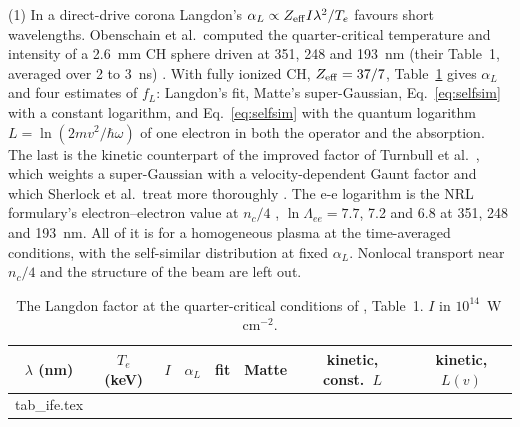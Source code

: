 \documentclass[11pt]{article}
\makeatletter
\numberwithin{equation}{section}
\newcommand{\tabinput}[1]{\@@input #1 }
\newcommand{\lnL}{\ln\Lambda}
\makeatother
\begin{document}
{\noindent}(1) In a direct-drive corona Langdon's $\alpha_L\propto
Z_{\rm eff}I\lambda^2/T_e$ favours short wavelengths. Obenschain et al.\ computed
the quarter-critical temperature and intensity of a 2.6~mm CH sphere driven at 351,
248 and 193~nm (their Table~1, averaged over 2 to 3~ns) \cite{Obenschain2020}. With
fully ionized CH, $Z_{\rm eff}=37/7$, Table~\ref{tab:ife} gives $\alpha_L$ and four
estimates of $f_L$: Langdon's fit, Matte's super-Gaussian, Eq.~\eqref{eq:selfsim}
with a constant logarithm, and Eq.~\eqref{eq:selfsim} with the quantum logarithm
$L=\ln(2mv^2/\hbar\omega)$ of one electron in both the operator and the absorption.
The last is the kinetic counterpart of the improved factor of Turnbull et al.\
\cite{Turnbull2024}, which weights a super-Gaussian with a velocity-dependent Gaunt
factor and which Sherlock et al.\ treat more thoroughly \cite{Sherlock2024}. The e-e
logarithm is the NRL formulary's electron--electron value at $n_c/4$ \cite{NRL},
$\lnL_{ee}=7.7$, 7.2 and 6.8 at 351, 248 and 193~nm. All of it is for a homogeneous
plasma at the time-averaged conditions, with the self-similar distribution at fixed
$\alpha_L$. Nonlocal transport near $n_c/4$ and the structure of the beam are left out.

\begin{table}[h]
\centering
\caption{The Langdon factor at the quarter-critical conditions of
\cite{Obenschain2020}, Table~1. $I$ in $10^{14}$~W\,cm$^{-2}$.}
\label{tab:ife}
\begin{tabular}{cccccccc}
\toprule
$\lambda$ (nm) & $T_e$ (keV) & $I$ & $\alpha_L$ & fit & Matte & kinetic, const.\ $L$ & kinetic, $L(v)$\\
\midrule
\tabinput{tab_ife.tex}
\bottomrule
\end{tabular}
\end{table}
\end{document}
